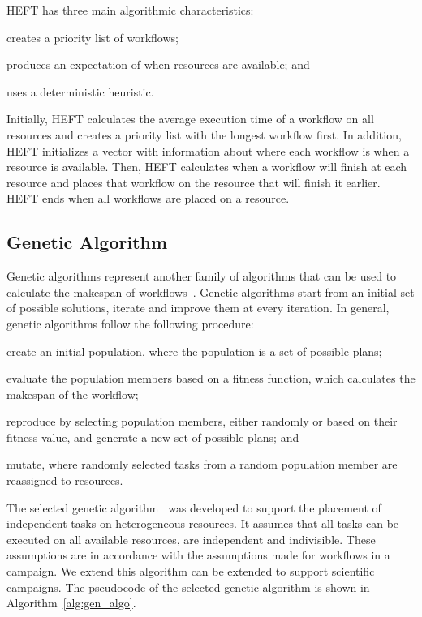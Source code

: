 HEFT has three main algorithmic characteristics:
\begin{inparaenum}[(1)]
    \item creates a priority list of workflows;
    \item produces an expectation of when resources are available; and
    \item uses a deterministic heuristic.
\end{inparaenum}
Initially, HEFT calculates the average execution time of a workflow on all
resources and creates a priority list with the longest workflow first. In
addition, HEFT initializes a vector with information about where each workflow
is when a resource is available. Then, HEFT calculates when a workflow will
finish at each resource and places that workflow on the resource that will finish
it earlier. HEFT ends when all workflows are placed on a resource.


\subsection{Genetic Algorithm}
\label{algo:gen}

Genetic algorithms represent another family of algorithms that can be  used to
calculate the makespan of workflows~\cite{dong2006scheduling}. Genetic
algorithms start from an initial set of possible solutions, iterate and
improve them at every iteration. In general, genetic algorithms follow the
following procedure:
\begin{inparaenum}[(i)]
    \item create an initial population, where the population is a set of
    possible plans;
    \item evaluate the population members based on a fitness function, which
    calculates the makespan of the workflow;
    \item reproduce by selecting population members, either randomly or based
    on their fitness value, and generate a new set of possible plans; and
    \item mutate, where randomly selected tasks from a random population
    member are reassigned to resources.
\end{inparaenum}

The selected genetic algorithm~\cite{page2005algorithm} was developed to
support the placement of independent tasks on heterogeneous resources. It
assumes that all tasks can be executed on all available resources, are
independent and indivisible. These assumptions are in accordance with the
assumptions made for workflows in a campaign. We extend this algorithm can be
extended to support scientific campaigns. The pseudocode of the selected
genetic algorithm is shown in Algorithm~\ref{alg:gen_algo}.

